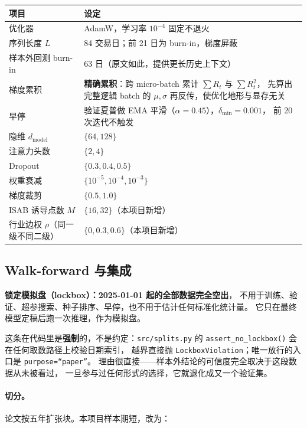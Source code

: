 \documentclass[11pt, a4paper]{ctexart}
\newcommand{\file}[1]{\texttt{\small #1}}
\begin{document}
\begin{table}[h]
\centering
\small
\begin{tabular}{ll}
\toprule
项目 & 设定 \\
\midrule
优化器 & AdamW，学习率 $10^{-4}$ 固定不退火 \\
序列长度 $L$ & 84 交易日；前 21 日为 burn-in，梯度屏蔽 \\
样本外回测 burn-in & 63 日（原文如此，提供更长历史上下文） \\
梯度累积 & \textbf{精确累积}：跨 micro-batch 累计 $\sum R_t$ 与 $\sum R_t^2$，
  先算出完整逻辑 batch 的 $\mu,\sigma$ 再反传，使优化地形与显存无关 \\
早停 & 验证夏普做 EMA 平滑（$\alpha=0.45$），$\delta_{\min}=0.001$，
  前 20 次迭代不触发 \\
隐维 $d_{\text{model}}$ & $\{64, 128\}$ \\
注意力头数 & $\{2, 4\}$ \\
Dropout & $\{0.3, 0.4, 0.5\}$ \\
权重衰减 & $\{10^{-5}, 10^{-4}, 10^{-3}\}$ \\
梯度裁剪 & $\{0.5, 1.0\}$ \\
ISAB 诱导点数 $M$ & $\{16, 32\}$（本项目新增） \\
行业边权 $\rho$（同一级不同二级） & $\{0, 0.3, 0.6\}$（本项目新增） \\
\bottomrule
\end{tabular}
\end{table}

\subsection{Walk-forward 与集成}

\begin{warnbox}
\textbf{锁定模拟盘（lockbox）：2025-01-01 起的全部数据完全空出}，
不用于训练、验证、超参搜索、种子排序、早停，也不用于估计任何标准化统计量。
它只在最终模型定稿后跑一次推理，作为模拟盘。

这条在代码里是\textbf{强制}的，不是约定：\file{src/splits.py} 的
\file{assert\_no\_lockbox()} 会在任何取数路径上校验日期索引，
越界直接抛 \file{LockboxViolation}；唯一放行的入口是 \file{purpose=“paper”}。
理由很直接——样本外结论的可信度完全取决于这段数据从未被看过，
一旦参与过任何形式的选择，它就退化成又一个验证集。
\end{warnbox}

\paragraph{切分。}论文按五年扩张块。本项目样本期短，改为：
\end{document}
